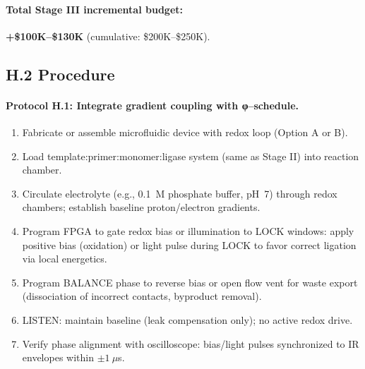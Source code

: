 \documentclass[11pt]{article}
\begin{document}
\paragraph{Total Stage III incremental budget:} \textbf{+\$100K–\$130K} (cumulative: \$200K–\$250K).

\subsection*{H.2 Procedure}

\paragraph{Protocol H.1: Integrate gradient coupling with φ–schedule.}
\begin{enumerate}
\item Fabricate or assemble microfluidic device with redox loop (Option A or B).
\item Load template:primer:monomer:ligase system (same as Stage II) into reaction chamber.
\item Circulate electrolyte (e.g., 0.1~M phosphate buffer, pH~7) through redox chambers; establish baseline proton/electron gradients.
\item Program FPGA to gate redox bias or illumination to \textsf{LOCK} windows: apply positive bias (oxidation) or light pulse during \textsf{LOCK} to favor correct ligation via local energetics.
\item Program \textsf{BALANCE} phase to reverse bias or open flow vent for waste export (dissociation of incorrect contacts, byproduct removal).
\item \textsf{LISTEN}: maintain baseline (leak compensation only); no active redox drive.
\item Verify phase alignment with oscilloscope: bias/light pulses synchronized to IR envelopes within $\pm 1~\mu$s.
\end{enumerate}
\end{document}
